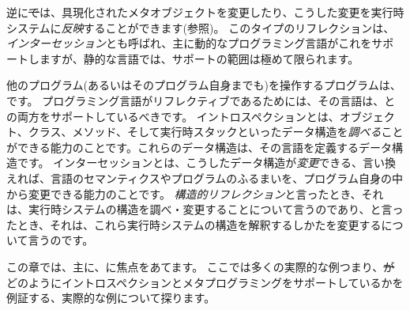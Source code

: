 \documentclass[a4paper,10pt,twoside]{book}
\begin{document}
逆に\st では、具現化されたメタオブジェクトを変更したり、こうした変更を実行時システムに\emph{反映}することができます(参照)。
このタイプのリフレクションは、\emph{インターセッション}とも呼ばれ、主に動的なプログラミング言語がこれをサポートしますが、静的な言語では、サポートの範囲は極めて限られます。

他のプログラム(あるいはそのプログラム自身までも)を操作するプログラムは、です。
プログラミング言語がリフレクティブであるためには、その言語は、との両方をサポートしているべきです。
イントロスペクションとは、オブジェクト、クラス、メソッド、そして実行時スタックといったデータ構造を\emph{調べる}ことができる能力のことです。これらのデータ構造は、その言語を定義するデータ構造です。
インターセッションとは、こうしたデータ構造が\emph{変更}できる、言い換えれば、言語のセマンティクスやプログラムのふるまいを、プログラム自身の中から変更できる能力のことです。
\emph{構造的リフレクション}と言ったとき、それは、実行時システムの構造を調べ・変更することについて言うのであり、と言ったとき、それは、これら実行時システムの構造を解釈するしかたを変更するについて言うのです。

この章では、主に、に焦点をあてます。
ここでは多くの実際的な例つまり、\st がどのようにイントロスペクションとメタプログラミングをサポートしているかを例証する、実際的な例について探ります。
\end{document}
